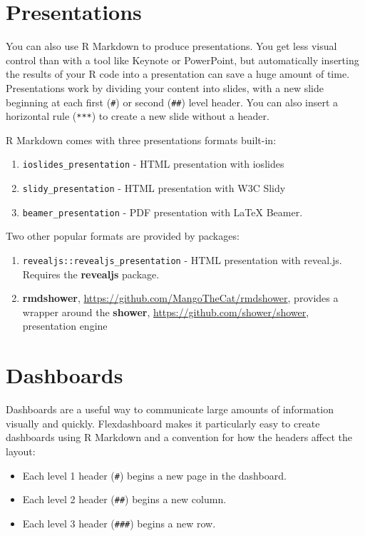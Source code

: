 \documentclass[]{book}
\providecommand{\tightlist}{%
  \setlength{\itemsep}{0pt}\setlength{\parskip}{0pt}}
\begin{document}
\section{Presentations}\label{presentations}

You can also use R Markdown to produce presentations. You get less
visual control than with a tool like Keynote or PowerPoint, but
automatically inserting the results of your R code into a presentation
can save a huge amount of time. Presentations work by dividing your
content into slides, with a new slide beginning at each first
(\texttt{\#}) or second (\texttt{\#\#}) level header. You can also
insert a horizontal rule (\texttt{***}) to create a new slide without a
header.

R Markdown comes with three presentations formats built-in:

\begin{enumerate}
\def\labelenumi{\arabic{enumi}.}
\item
  \texttt{ioslides\_presentation} - HTML presentation with ioslides
\item
  \texttt{slidy\_presentation} - HTML presentation with W3C Slidy
\item
  \texttt{beamer\_presentation} - PDF presentation with LaTeX Beamer.
\end{enumerate}

Two other popular formats are provided by packages:

\begin{enumerate}
\def\labelenumi{\arabic{enumi}.}
\item
  \texttt{revealjs::revealjs\_presentation} - HTML presentation with
  reveal.js. Requires the \textbf{revealjs} package.
\item
  \textbf{rmdshower}, \url{https://github.com/MangoTheCat/rmdshower},
  provides a wrapper around the \textbf{shower},
  \url{https://github.com/shower/shower}, presentation engine
\end{enumerate}

\section{Dashboards}\label{dashboards}

Dashboards are a useful way to communicate large amounts of information
visually and quickly. Flexdashboard makes it particularly easy to create
dashboards using R Markdown and a convention for how the headers affect
the layout:

\begin{itemize}
\tightlist
\item
  Each level 1 header (\texttt{\#}) begins a new page in the dashboard.
\item
  Each level 2 header (\texttt{\#\#}) begins a new column.
\item
  Each level 3 header (\texttt{\#\#\#}) begins a new row.
\end{itemize}
\end{document}
